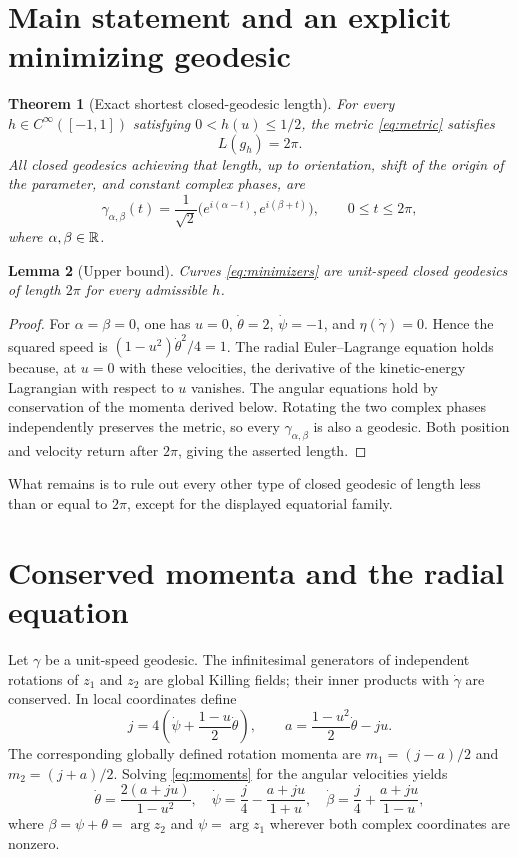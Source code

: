 \documentclass[11pt,a4paper]{article}
\newtheorem{theorem}{Theorem}[section]
\newtheorem{lemma}[theorem]{Lemma}
\theoremstyle{remark}\newtheorem{remark}[theorem]{Remark}
\begin{document}
\section{Main statement and an explicit minimizing geodesic}
\begin{theorem}[Exact shortest closed-geodesic length]\label{thm:main}
For every $h\in C^\infty([-1,1])$ satisfying $0<h(u)\leq1/2$, the metric \eqref{eq:metric} satisfies
\[
\boxed{L(g_h)=2\pi.}
\]
All closed geodesics achieving that length, up to orientation, shift of the origin of the parameter, and constant complex phases, are
\begin{equation}\label{eq:minimizers}
\gamma_{\alpha,\beta}(t)=\frac1{\sqrt2}\bigl(e^{i(\alpha-t)},e^{i(\beta+t)}\bigr),\qquad 0\leq t\leq2\pi,
\end{equation}
where $\alpha,\beta\in\mathbb R$.
\end{theorem}
\begin{lemma}[Upper bound]\label{lem:upper}
Curves \eqref{eq:minimizers} are unit-speed closed geodesics of length $2\pi$ for every admissible $h$.
\end{lemma}
\begin{proof}
For $\alpha=\beta=0$, one has $u=0$, $\dot\theta=2$, $\dot\psi=-1$, and $\eta(\dot\gamma)=0$. Hence the squared speed is $(1-u^2)\dot\theta^2/4=1$. The radial Euler--Lagrange equation holds because, at $u=0$ with these velocities, the derivative of the kinetic-energy Lagrangian with respect to $u$ vanishes. The angular equations hold by conservation of the momenta derived below. Rotating the two complex phases independently preserves the metric, so every $\gamma_{\alpha,\beta}$ is also a geodesic. Both position and velocity return after $2\pi$, giving the asserted length.
\end{proof}
What remains is to rule out every other type of closed geodesic of length less than or equal to $2\pi$, except for the displayed equatorial family.

\section{Conserved momenta and the radial equation}
Let $\gamma$ be a unit-speed geodesic. The infinitesimal generators of independent rotations of $z_1$ and $z_2$ are global Killing fields; their inner products with $\dot\gamma$ are conserved. In local coordinates define
\begin{equation}\label{eq:moments}
j=4\left(\dot\psi+\frac{1-u}{2}\dot\theta\right),\qquad
a=\frac{1-u^2}{2}\dot\theta-ju.
\end{equation}
The corresponding globally defined rotation momenta are $m_1=(j-a)/2$ and $m_2=(j+a)/2$. Solving \eqref{eq:moments} for the angular velocities yields
\begin{equation}\label{eq:angles}
\dot\theta=\frac{2(a+ju)}{1-u^2},\quad
\dot\psi=\frac j4-\frac{a+ju}{1+u},\quad
\dot\beta=\frac j4+\frac{a+ju}{1-u},
\end{equation}
where $\beta=\psi+\theta=\arg z_2$ and $\psi=\arg z_1$ wherever both complex coordinates are nonzero.
\end{document}
